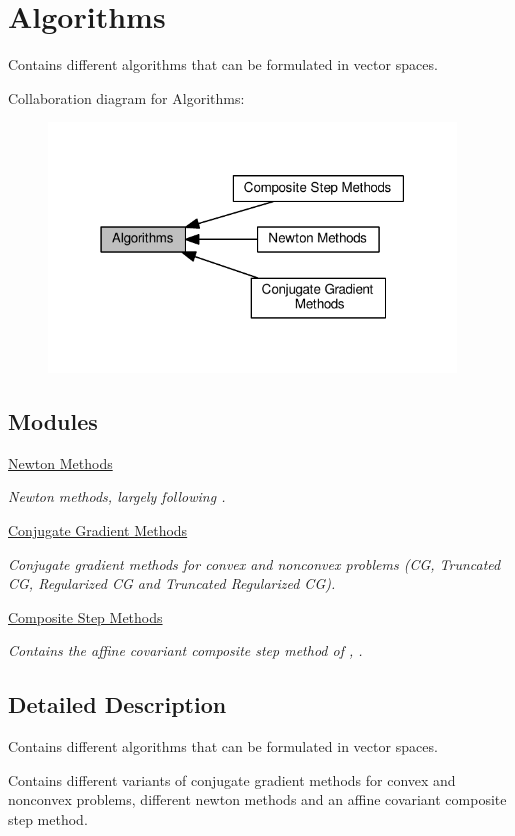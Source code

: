 \hypertarget{group__AlgorithmGroup}{}\section{Algorithms}
\label{group__AlgorithmGroup}


Contains different algorithms that can be formulated in vector spaces.  


Collaboration diagram for Algorithms\+:\nopagebreak
\begin{figure}[H]
\begin{center}
\leavevmode
\includegraphics[width=307pt]{group__AlgorithmGroup}
\end{center}
\end{figure}
\subsection*{Modules}
\begin{DoxyCompactItemize}
\item 
\hyperlink{group__NewtonGroup}{Newton Methods}
\begin{DoxyCompactList}\small\item\em Newton methods, largely following \cite{Deuflhard2004}. \end{DoxyCompactList}\item 
\hyperlink{group__CGGroup}{Conjugate Gradient Methods}
\begin{DoxyCompactList}\small\item\em Conjugate gradient methods for convex and nonconvex problems (C\+G, Truncated C\+G, Regularized C\+G and Truncated Regularized C\+G). \end{DoxyCompactList}\item 
\hyperlink{group__CSGroup}{Composite Step Methods}
\begin{DoxyCompactList}\small\item\em Contains the affine covariant composite step method of \cite{Lubkoll2015}, \cite{Lubkoll2015a}. \end{DoxyCompactList}\end{DoxyCompactItemize}


\subsection{Detailed Description}
Contains different algorithms that can be formulated in vector spaces. 

Contains different variants of conjugate gradient methods for convex and nonconvex problems, different newton methods and an affine covariant composite step method. 